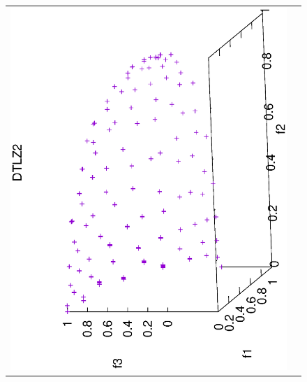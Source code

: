 \begin{figure}[H]
\begin{tabular}{cc}
  \includegraphics[scale=0.3, angle=-90,origin=c]{Figures_Chapter7/Results_Chapter4/Summary_Representative/VSD-MOEA-D/DTLZ2.eps} \\

\end{tabular}
\end{figure}
